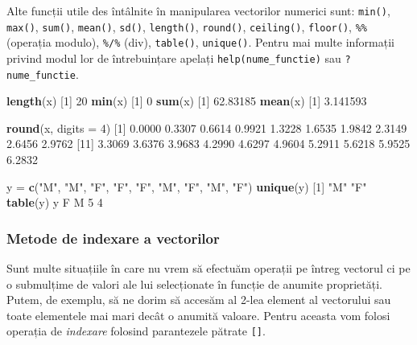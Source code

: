 \documentclass[]{article}
\newenvironment{Shaded}{\begin{snugshade}}{\end{snugshade}}
\newcommand{\DataTypeTok}[1]{\textcolor[rgb]{0.13,0.29,0.53}{#1}}
\newcommand{\DecValTok}[1]{\textcolor[rgb]{0.00,0.00,0.81}{#1}}
\newcommand{\FloatTok}[1]{\textcolor[rgb]{0.00,0.00,0.81}{#1}}
\newcommand{\KeywordTok}[1]{\textcolor[rgb]{0.13,0.29,0.53}{\textbf{#1}}}
\newcommand{\NormalTok}[1]{#1}
\newcommand{\StringTok}[1]{\textcolor[rgb]{0.31,0.60,0.02}{#1}}
\begin{document}
Alte funcții utile des întâlnite în manipularea vectorilor numerici
sunt: \texttt{min()}, \texttt{max()}, \texttt{sum()}, \texttt{mean()},
\texttt{sd()}, \texttt{length()}, \texttt{round()}, \texttt{ceiling()},
\texttt{floor()}, \texttt{\%\%} (operația modulo), \texttt{\%/\%} (div),
\texttt{table()}, \texttt{unique()}. Pentru mai multe informații privind
modul lor de întrebuințare apelați \texttt{help(nume\_functie)} sau
\texttt{?nume\_functie}.

\begin{Shaded}
\begin{Highlighting}[]
\KeywordTok{length}\NormalTok{(x)}
\NormalTok{[}\DecValTok{1}\NormalTok{] }\DecValTok{20}
\KeywordTok{min}\NormalTok{(x)}
\NormalTok{[}\DecValTok{1}\NormalTok{] }\DecValTok{0}
\KeywordTok{sum}\NormalTok{(x)}
\NormalTok{[}\DecValTok{1}\NormalTok{] }\FloatTok{62.83185}
\KeywordTok{mean}\NormalTok{(x)}
\NormalTok{[}\DecValTok{1}\NormalTok{] }\FloatTok{3.141593}

\KeywordTok{round}\NormalTok{(x, }\DataTypeTok{digits =} \DecValTok{4}\NormalTok{)}
\NormalTok{ [}\DecValTok{1}\NormalTok{] }\FloatTok{0.0000} \FloatTok{0.3307} \FloatTok{0.6614} \FloatTok{0.9921} \FloatTok{1.3228} \FloatTok{1.6535} \FloatTok{1.9842} \FloatTok{2.3149} \FloatTok{2.6456} \FloatTok{2.9762}
\NormalTok{[}\DecValTok{11}\NormalTok{] }\FloatTok{3.3069} \FloatTok{3.6376} \FloatTok{3.9683} \FloatTok{4.2990} \FloatTok{4.6297} \FloatTok{4.9604} \FloatTok{5.2911} \FloatTok{5.6218} \FloatTok{5.9525} \FloatTok{6.2832}

\NormalTok{y =}\StringTok{  }\KeywordTok{c}\NormalTok{(}\StringTok{"M"}\NormalTok{, }\StringTok{"M"}\NormalTok{, }\StringTok{"F"}\NormalTok{, }\StringTok{"F"}\NormalTok{, }\StringTok{"F"}\NormalTok{, }\StringTok{"M"}\NormalTok{, }\StringTok{"F"}\NormalTok{, }\StringTok{"M"}\NormalTok{, }\StringTok{"F"}\NormalTok{)}
\KeywordTok{unique}\NormalTok{(y)}
\NormalTok{[}\DecValTok{1}\NormalTok{] }\StringTok{"M"} \StringTok{"F"}
\KeywordTok{table}\NormalTok{(y)}
\NormalTok{y}
\NormalTok{F M }
\DecValTok{5} \DecValTok{4} 
\end{Highlighting}
\end{Shaded}

\hypertarget{metode-de-indexare-a-vectorilor}{%
\subsubsection{Metode de indexare a
vectorilor}\label{metode-de-indexare-a-vectorilor}}

Sunt multe situațiile în care nu vrem să efectuăm operații pe întreg
vectorul ci pe o submulțime de valori ale lui selecționate în funcție de
anumite proprietăți. Putem, de exemplu, să ne dorim să accesăm al 2-lea
element al vectorului sau toate elementele mai mari decât o anumită
valoare. Pentru aceasta vom folosi operația de \emph{indexare} folosind
parantezele pătrate \texttt{{[}{]}}.
\end{document}
